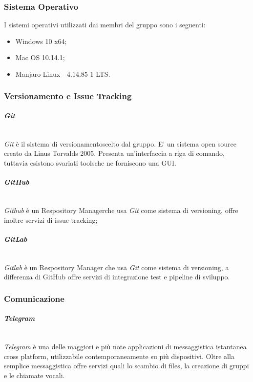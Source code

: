 \subsubsection{Sistema Operativo}
	I sistemi operativi utilizzati dai membri del gruppo sono i seguenti:
	\begin{itemize}
	\item Windows 10 x64;
	\item Mac OS 10.14.1;
	\item Manjaro Linux - 4.14.85-1 LTS.
	\end{itemize}

\subsubsection{Versionamento e Issue Tracking}

\paragraph{\textit{Git}} ~\\
	\textit{Git} è il sistema di versionamento\glossario scelto dal gruppo. E' un sistema open source creato da Linus 	Torvalds 2005. Presenta un'interfaccia a riga di comando, tuttavia esistono svariati tools\glossario 	che 	ne forniscono una GUI.

\paragraph{\textit{GitHub}} ~\\
	\textit{Github} è un Respository Manager\glossario che usa \textit{Git} come sistema di versioning, offre inoltre 	servizi di issue tracking\glossario;
	
\paragraph{\textit{GitLab}} \-\\
	\textit{Gitlab} è un Respository Manager che usa \textit{Git} come sistema di versioning, a differenza di GitHub offre servizi di integrazione test e pipeline di sviluppo. 

\subsubsection{Comunicazione}

\paragraph{\textit{Telegram}} ~\\
	\textit{Telegram} è una delle maggiori e più note applicazioni di messaggistica istantanea cross platform, 					utilizzabile contemporaneamente su più dispositivi. Oltre alla semplice messaggistica offre servizi quali lo 				scambio di files, la creazione di gruppi e le chiamate vocali.

